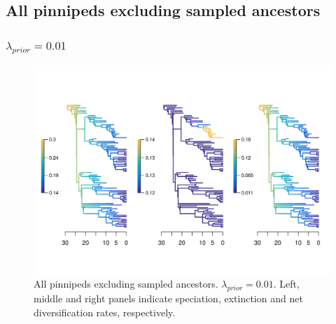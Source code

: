\documentclass[a4paper, 12pt]{article}
\begin{document}
\subsection{All pinnipeds excluding sampled ancestors}

\subsubsection{$\lambda_{prior} = 0.01$}

\begin{figure}[H]
  \centering
  \includegraphics[width = \linewidth]{figures/diversification/sensitivity-analyses/shifts-0-01/sensitivity-analysis-noanc-0-01.png}
  \caption{All pinnipeds excluding sampled ancestors. $\lambda_{prior} = 0.01$. Left, middle and right panels indicate speciation, extinction and net diversification rates, respectively.}
  \label{fig-noanc-0-01}
\end{figure}
\end{document}
